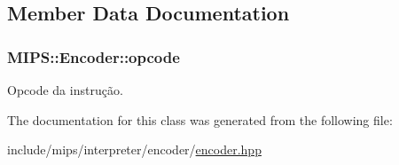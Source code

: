 \subsection{Member Data Documentation}
\subsubsection[{\texorpdfstring{opcode}{opcode}}]{ M\+I\+P\+S\+::\+Encoder\+::opcode\hspace{0.3cm}{\ttfamily [protected]}}\hypertarget{classMIPS_1_1Encoder_a1d07a78c088f8180af5f7b9ec3ca10f0}{}\label{classMIPS_1_1Encoder_a1d07a78c088f8180af5f7b9ec3ca10f0}
Opcode da instrução. 

The documentation for this class was generated from the following file\+:\begin{DoxyCompactItemize}
\item 
include/mips/interpreter/encoder/\hyperlink{encoder_8hpp}{encoder.\+hpp}\end{DoxyCompactItemize}
